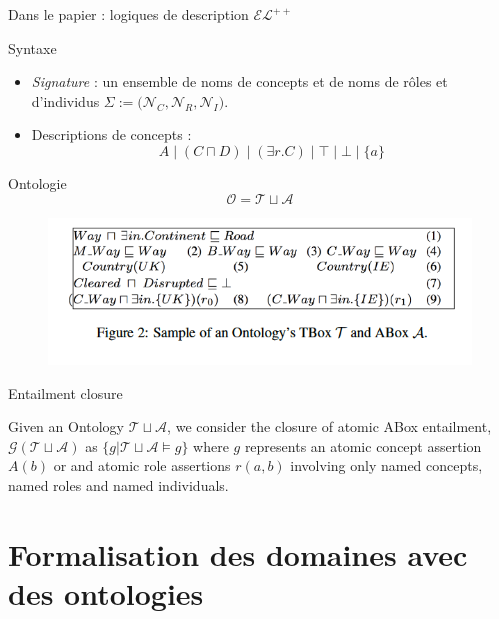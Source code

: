 \documentclass{beamer}
\newcommand{\C}{\ensuremath{\mathbb C}}
\newcommand{\NC}{\ensuremath{\mathcal{N}_C}}
\newcommand{\NR}{\ensuremath{\mathcal{N}_R}}
\begin{document}
\begin{frame}{Dans le papier : logiques de description $\mathcal{E}\mathcal{L}^{++}$}
\begin{block}{Syntaxe}
 \begin{itemize}
 \item \emph{Signature} :  un ensemble de noms de concepts et de noms de rôles et d'individus  $\Sigma:=(\NC{}, $\NR$, \mathcal{N}_I)$.
 \item Descriptions de concepts :
 \[
A \mid (C \sqcap D) \mid (\exists r.C) \mid \top  \mid \bot \mid \{a\}
 \]
 \end{itemize}
\end{block}

\begin{block}{Ontologie}
\[
\mathcal{O} = \mathcal{T} \sqcup \mathcal{A}
\]
\end{block}

\begin{figure}
    \centering
    \includegraphics[scale=0.4]{Figures/Tboxexample.png}
\end{figure}

\end{frame}


\begin{frame}{Entailment closure}

Given an Ontology $\mathcal{T} \sqcup \mathcal{A}$, we consider the closure of atomic ABox entailment, $\mathcal{G}(\mathcal{T} \sqcup \mathcal{A})$ as  $\{g | \mathcal{T} \sqcup \mathcal{A} \models g \}$ where $g$ represents an atomic concept assertion $A(b)$ or and atomic role assertions $r(a,b)$ involving only named concepts, named roles and named individuals.

\end{frame}


\section[Formalisation]{Formalisation des domaines avec des ontologies}
\end{document}
